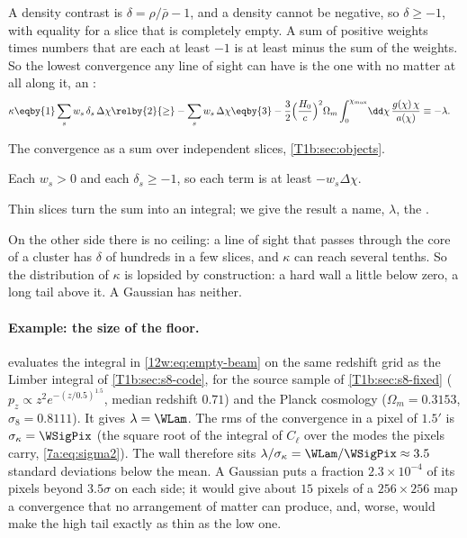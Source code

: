 A density contrast is $\delta=\rho/\bar\rho-1$, and a density cannot be negative, so $\delta\ge-1$, with equality
for a slice that is completely empty. A sum of positive weights times numbers that are each at least $-1$ is at
least minus the sum of the weights. So the lowest convergence any line of sight can have is the one with no matter
at all along it, an :
\begin{align}
\kappa
&\eqby{1}\sum_sw_s\,\delta_s\,\Delta\chi
\relby{2}{\ge}-\sum_sw_s\,\Delta\chi
\eqby{3}-\frac32\Bigl(\frac{H_0}{c}\Bigr)^2\Omega_m\int_0^{\chi_{\max}}\!\dd\chi\,\frac{g(\chi)\,\chi}{a(\chi)}
\equiv-\lambda .
\label{12w:eq:empty-beam}
\end{align}
\begin{explain}
  \item The convergence as a sum over independent slices, \cref{T1b:sec:objects}.
  \item Each $w_s>0$ and each $\delta_s\ge-1$, so each term is at least $-w_s\Delta\chi$.
  \item Thin slices turn the sum into an integral; we give the result a name, $\lambda$, the .
\end{explain}
On the other side there is no ceiling: a line of sight that passes through the core of a cluster has $\delta$ of
hundreds in a few slices, and $\kappa$ can reach several tenths. So the distribution of $\kappa$ is lopsided by
construction: a hard wall a little below zero, a long tail above it. A Gaussian has neither.

\paragraph{Example: the size of the floor.}
 evaluates the integral in \eqref{12w:eq:empty-beam} on the same redshift grid as
the Limber integral of \cref{T1b:sec:s8-code}, for the source sample of \cref{T1b:sec:s8-fixed}
($p_z\propto z^2e^{-(z/0.5)^{1.5}}$, median redshift $0.71$) and the Planck cosmology ($\Omega_m=0.3153$,
$\sigma_8=0.8111$). It gives $\lambda=\WLam$. The rms of the convergence in a pixel of $1.5'$ is
$\sigma_\kappa=\WSigPix$ (the square root of the integral of $C_\ell$ over the modes the pixels carry,
\eqref{7a:eq:sigma2}). The wall therefore sits $\lambda/\sigma_\kappa=\WLam/\WSigPix\approx3.5$ standard deviations
below the mean. A Gaussian puts a fraction $2.3\times10^{-4}$ of its pixels beyond $3.5\sigma$ on each side; it would
give about $15$ pixels of a $256\times256$ map a convergence that no arrangement of matter can produce, and, worse,
would make the high tail exactly as thin as the low one.

